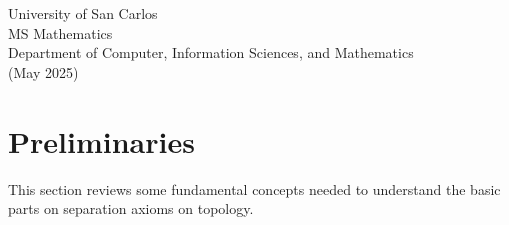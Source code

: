 \documentclass[12pt]{article} %
\begin{document}
{\normalsize University of San Carlos \\ MS Mathematics \\ Department of Computer, Information Sciences, and Mathematics} \\
{\small (May 2025)} \\
\endgroup










\pagestyle{empty} %
\newpage
\tableofcontents %


\pagestyle{fancy} %


\newpage
\section{Preliminaries}
This section reviews some fundamental concepts needed to understand the basic parts on separation axioms on topology. 
\end{document}
